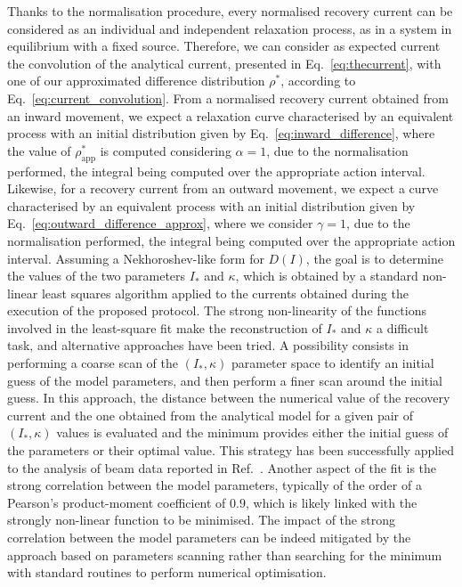 Thanks to the normalisation procedure, every normalised recovery current can be considered as an individual and independent relaxation process, as in a system in equilibrium with a fixed source. Therefore, we can consider as expected current the convolution of the analytical current, presented in Eq.~\eqref{eq:thecurrent}, with one of our approximated difference distribution $\rho^\ast$, {according to Eq.~\eqref{eq:current_convolution}}. From a normalised recovery current obtained from an inward movement, we expect a relaxation curve characterised by an equivalent process with an initial distribution given by Eq.~\eqref{eq:inward_difference}, where the value of $\rho^\ast_\text{app}$ is computed considering $\alpha=1$, due to the normalisation performed, the integral being computed over the appropriate action interval. Likewise, for a recovery current from an outward movement, we expect a curve characterised by an equivalent process with an initial distribution given by Eq.~\eqref{eq:outward_difference_approx}, where we consider $\gamma=1$, due to the normalisation performed, the integral being computed over the appropriate action interval. Assuming a Nekhoroshev-like form for $D(I)$, the goal is to determine the values of the two parameters $I_\ast$ and $\kappa$, which is obtained by a standard non-linear least squares algorithm applied to the currents obtained during the execution of the proposed protocol. {The strong non-linearity of the functions involved in the least-square fit make the reconstruction of $I_\ast$ and $\kappa$ a difficult task, and alternative approaches have been tried. A possibility consists in performing a coarse scan of the $(I_\ast, \kappa)$ parameter space to identify an initial guess of the model parameters, and then perform a finer scan around the initial guess. In this approach, the distance between the numerical value of the recovery current and the one obtained from the analytical model for a given pair of $(I_\ast, \kappa)$ values is evaluated and the minimum provides either the initial guess of the parameters or their optimal value. This strategy has been successfully applied to the analysis of beam data reported in Ref.~\cite{montanari:ipac22-mopost043}. Another aspect of the fit is the strong correlation between the model parameters, typically of the order of a Pearson's product-moment coefficient of $0.9$, which is likely linked with the strongly non-linear function to be minimised. The impact of the strong correlation between the model parameters can be indeed mitigated by the approach based on parameters scanning rather than searching for the minimum with standard routines to perform numerical optimisation.}

